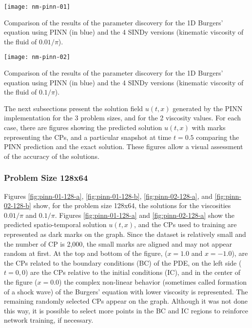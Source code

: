 \begin{table}[htb]\centering
\texttt{[image: nm-pinn-01]}
\vspace{1em}
\caption{Comparison of the results of the parameter discovery for the 1D Burgers' equation using PINN (in blue) and the 4 SINDy versions (kinematic viscosity of the fluid of ${0.01}/{\pi}$).}
\label{tab:nm-pinn-01}
\end{table}

\begin{table}[htb]\centering
\texttt{[image: nm-pinn-02]}
\vspace{1em}
\caption{Comparison of the results of the parameter discovery for the 1D Burgers' equation using PINN (in blue) and the 4 SINDy versions (kinematic viscosity of the fluid of ${0.1}/{\pi}$).}
\label{tab:nm-pinn-02}
\end{table}

The next subsections present the solution field $u(t,x)$ generated by the PINN implementation for the 3 problem sizes, and for the 2 viscosity values. For each case, there are figures showing the predicted solution $u(t,x)$ with marks representing the CPs, and a particular snapshot at time $t=0.5$ comparing the PINN prediction and the exact solution. These figures allow a visual assessment of the accuracy of the solutions.

\FloatBarrier

\subsubsection{Problem Size 128x64}

Figures \ref{fig:pinn-01-128-a}, \ref{fig:pinn-01-128-b}, \ref{fig:pinn-02-128-a}, and \ref{fig:pinn-02-128-b} show, for the problem size 128x64, the solutions for the viscosities ${0.01}/{\pi}$ and ${0.1}/{\pi}$. Figures \ref{fig:pinn-01-128-a} and \ref{fig:pinn-02-128-a} show the predicted spatio-temporal solution $u(t, x)$, and the CPs used to training are represented as dark marks on the graph. Since the dataset is relatively small and the number of CP is 2,000, the small marks are aligned and may not appear random at first. 
At the top and bottom of the figure, ($x=1.0$ and $x=-1.0$), are the CPs related to the boundary conditions (BC) of the PDE, on the left side ($t=0, 0$) are the CPs relative to the initial conditions (IC), and in the center of the figure ($x=0.0$) the complex non-linear behavior (sometimes called formation of a shock wave) of the Burgers' equation with lower viscosity is represented. The remaining randomly selected CPs appear on the graph. Although it was not done this way, it is possible to select more points in the BC and IC regions to reinforce network training, if necessary.

